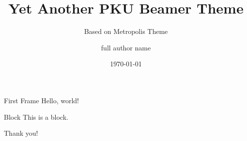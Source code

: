 \documentclass[10pt]{beamer}
\title{Yet Another PKU Beamer Theme}
\subtitle{Based on Metropolis Theme}
\date{\today}
\author[short author name]{full author name}
\institute{Peking University}
\begin{document}
  \maketitle
  
  \begin{frame}{First Frame}
    Hello, world!
    \begin{block}{Block}
        This is a block.
    \end{block}
  \end{frame}
  
  \begin{frame}[standout]
    Thank you!
  \end{frame}
\end{document}
